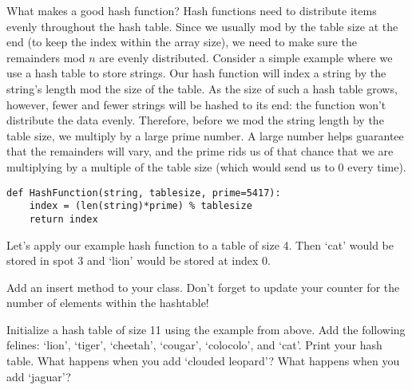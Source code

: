 What makes a good hash function?
Hash functions need to distribute items evenly throughout the hash table.
Since we usually mod by the table size at the end (to keep the index within the array size), we need to make sure the remainders mod $n$ are evenly distributed.
Consider a simple example where we use a hash table to store strings. Our hash function will index a string by the string's length mod the size of the table.
As the size of such a hash table grows, however, fewer and fewer strings will be hashed to its end: the function won't distribute the data evenly.
Therefore, before we mod the string length by the table size, we multiply by a large prime number.
A large number helps guarantee that the remainders will vary, and the prime rids us of that chance that we are multiplying by a multiple of the table size (which would send us to $0$ every time).

\begin{lstlisting}
def HashFunction(string, tablesize, prime=5417):
    index = (len(string)*prime) % tablesize
    return index
\end{lstlisting}
Let's apply our example hash function to a table of size 4.
Then `cat' would be stored in spot $3$ and `lion' would be stored at index $0$.
\begin{center}
\end{center}
\begin{problem}
Add an insert method to your  class. Don't forget to update your counter for the number of elements within the hashtable!

Initialize a hash table of size 11 using the example  from above. Add the following felines: `lion', `tiger', `cheetah', `cougar', `colocolo', and `cat'. Print your hash table. What happens when you add `clouded leopard'? What happens when you add `jaguar'?
\label{prob:hash insert}
\end{problem}

